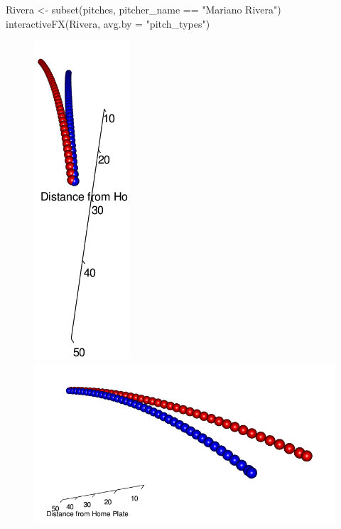 \documentclass[a4paper]{report}\usepackage[]{graphicx}\usepackage[]{color}
\begin{document}
\begin{article}
\begin{Schunk}
\begin{Sinput}
Rivera <- subset(pitches, pitcher_name == "Mariano Rivera")
interactiveFX(Rivera, avg.by = "pitch_types")
\end{Sinput}
\end{Schunk}


\begin{figure}[h]
\begin{minipage}[t]{0.45\textwidth}%
\centerline{\includegraphics[scale = .45]{rgl_b.png}}%
\end{minipage}\hspace*{\fill}%
\begin{minipage}[t]{0.45\textwidth}%
\centerline{\includegraphics[scale = .45]{rgl_a.png}}%
\end{minipage}


\end{figure}
\end{article}
\end{document}
